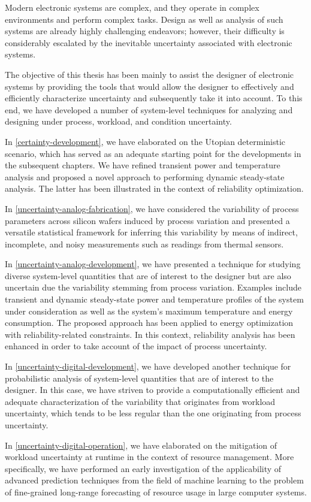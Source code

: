 Modern electronic systems are complex, and they operate in complex environments
and perform complex tasks. Design as well as analysis of such systems are
already highly challenging endeavors; however, their difficulty is considerably
escalated by the inevitable uncertainty associated with electronic systems.

The objective of this thesis has been mainly to assist the designer of
electronic systems by providing the tools that would allow the designer to
effectively and efficiently characterize uncertainty and subsequently take it
into account. To this end, we have developed a number of system-level techniques
for analyzing and designing under process, workload, and condition uncertainty.

In \cref{certainty-development}, we have elaborated on the Utopian deterministic
scenario, which has served as an adequate starting point for the developments in
the subsequent chapters. We have refined transient power and temperature
analysis and proposed a novel approach to performing dynamic steady-state
analysis. The latter has been illustrated in the context of reliability
optimization.

In \cref{uncertainty-analog-fabrication}, we have considered the variability of
process parameters across silicon wafers induced by process variation and
presented a versatile statistical framework for inferring this variability by
means of indirect, incomplete, and noisy measurements such as readings from
thermal sensors.

In \cref{uncertainty-analog-development}, we have presented a technique for
studying diverse system-level quantities that are of interest to the designer
but are also uncertain due the variability stemming from process variation.
Examples include transient and dynamic steady-state power and temperature
profiles of the system under consideration as well as the system's maximum
temperature and energy consumption. The proposed approach has been applied to
energy optimization with reliability-related constraints. In this context,
reliability analysis has been enhanced in order to take account of the impact of
process uncertainty.

In \cref{uncertainty-digital-development}, we have developed another technique
for probabilistic analysis of system-level quantities that are of interest to
the designer. In this case, we have striven to provide a computationally
efficient and adequate characterization of the variability that originates from
workload uncertainty, which tends to be less regular than the one originating
from process uncertainty.

In \cref{uncertainty-digital-operation}, we have elaborated on the mitigation of
workload uncertainty at runtime in the context of resource management. More
specifically, we have performed an early investigation of the applicability of
advanced prediction techniques from the field of machine learning to the problem
of fine-grained long-range forecasting of resource usage in large computer
systems.
